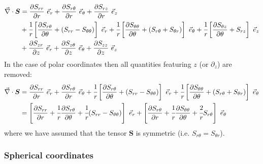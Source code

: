 \begin{align}
{\vec\nabla}\cdot {\bm S} & = \frac{\partial S_{rr}}{\partial r}~\vec{e}_r 
+ \frac{\partial S_{r\theta}}{\partial r}~\vec{e}_\theta
+ \frac{\partial S_{rz}}{\partial r}~\vec{e}_z  \nonumber\\
&  + \cfrac{1}{r}\left[\frac{\partial S_{r \theta}}{\partial \theta} + (S_{rr}-S_{\theta\theta})\right]~\vec{e}_r  +
\cfrac{1}{r}\left[\frac{\partial S_{\theta\theta}}{\partial \theta} + (S_{r\theta}+S_{\theta r})\right]~\vec{e}_\theta   +\cfrac{1}{r}\left[\frac{\partial S_{\theta z}}{\partial \theta} + S_{rz}\right]~\vec{e}_z \nonumber\\
 &  +
\frac{\partial S_{zr}}{\partial z}~\vec{e}_r +
\frac{\partial S_{z\theta}}{\partial z}~\vec{e}_\theta +
\frac{\partial S_{zz}}{\partial z}~\vec{e}_z \nonumber
\end{align}
In the case of polar coordinates then all quantities featuring $z$ (or $\partial_z$) are removed:
\begin{align}
{\vec\nabla}\cdot {\bm S} 
& = \frac{\partial S_{rr}}{\partial r}~\vec{e}_r 
+ \frac{\partial S_{r\theta}}{\partial r}~\vec{e}_\theta
+ \cfrac{1}{r}\left[\frac{\partial S_{r \theta}}{\partial \theta} + (S_{rr}-S_{\theta\theta})\right]~\vec{e}_r  +
\cfrac{1}{r}\left[\frac{\partial S_{\theta\theta}}{\partial \theta} + (S_{r\theta}+S_{\theta r})\right]~\vec{e}_\theta \nonumber\\
& = \left[\frac{\partial S_{rr}}{\partial r} +
\cfrac{1}{r} \frac{\partial S_{r \theta}}{\partial \theta}
+ \cfrac{1}{r} (S_{rr}-S_{\theta\theta})
\right] ~\vec{e}_r
+ \left[
\frac{\partial S_{r\theta}}{\partial r}
+\cfrac{1}{r} \frac{\partial S_{\theta\theta}}{\partial \theta}
+\cfrac{2}{r}  S_{r\theta}
\right]~\vec{e}_\theta
\label{eq:divtensor}
\end{align}
where we have assumed that the tensor ${\bm S}$ is symmetric (i.e. $S_{r\theta}=S_{\theta r}$).




\subsubsection{Spherical coordinates \label{ss:sphercoord}}

